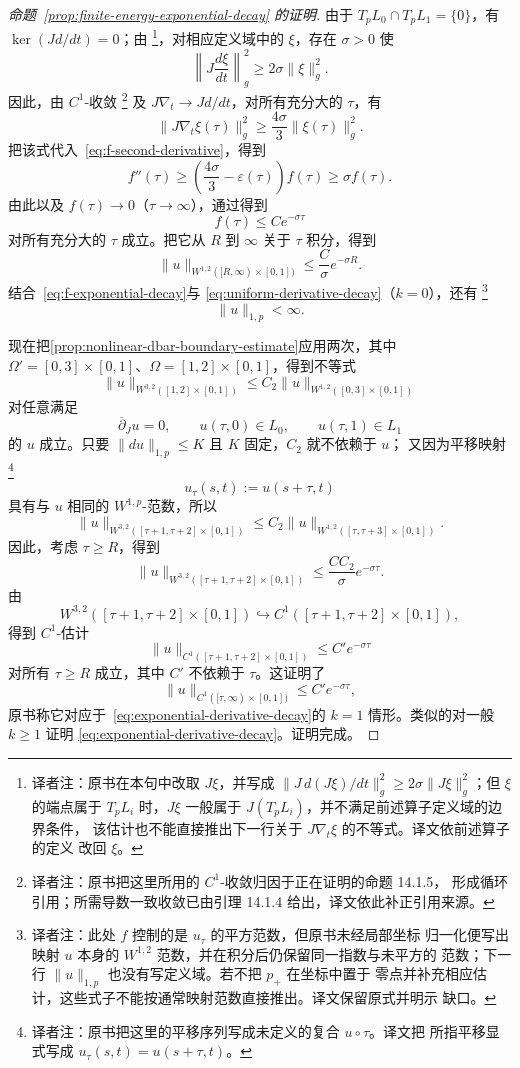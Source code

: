 \begin{proof}[命题~\ref{prop:finite-energy-exponential-decay} 的证明]
由于 $T_pL_0\cap T_pL_1=\{0\}$，有 $\ker(Jd/dt)=0$；由\termOpenMappingTheorem{}
\footnote{译者注：原书在本句中改取 $J\xi$，并写成
$\|J\,d(J\xi)/dt\|_g^2\geq2\sigma\|J\xi\|_g^2$；但 $\xi$ 的端点属于
$T_pL_i$ 时，$J\xi$ 一般属于 $J(T_pL_i)$，并不满足前述算子定义域的边界条件，
该估计也不能直接推出下一行关于 $J\nabla_t\xi$ 的不等式。译文依前述算子的定义
改回 $\xi$。}，对相应定义域中的 $\xi$，存在 $\sigma>0$ 使
\[
  \left\|J\frac{d\xi}{dt}\right\|_g^2
  \geq2\sigma\|\xi\|_g^2.
\]
因此，由 $C^1$-收敛
\footnote{译者注：原书把这里所用的 $C^1$-收敛归因于正在证明的命题 14.1.5，
形成循环引用；所需导数一致收敛已由引理 14.1.4 给出，译文依此补正引用来源。}
及 $J\nabla_t\to Jd/dt$，对所有充分大的 $\tau$，有
\[
  \|J\nabla_t\xi(\tau)\|_g^2
  \geq\frac{4\sigma}{3}\|\xi(\tau)\|_g^2.
\]
把该式代入~\eqref{eq:f-second-derivative}，得到
\[
  f''(\tau)
  \geq\left(\frac{4\sigma}{3}-\varepsilon(\tau)\right)f(\tau)
  \geq\sigma f(\tau).
\]
由此以及 $f(\tau)\to0$（$\tau\to\infty$），通过\termMaximumPrinciple{}得到
\begin{equation}
  f(\tau)\leq Ce^{-\sigma\tau}
\label{eq:f-exponential-decay}
\end{equation}
对所有充分大的 $\tau$ 成立。把它从 $R$ 到 $\infty$ 关于 $\tau$ 积分，得到
\[
  \|u\|_{W^{1,2}([R,\infty)\times[0,1])}
  \leq\frac C\sigma e^{-\sigma R}.
\]
结合~\eqref{eq:f-exponential-decay}与
\eqref{eq:uniform-derivative-decay}（$k=0$），还有
\footnote{译者注：此处 $f$ 控制的是 $u_\tau$ 的平方范数，但原书未经局部坐标
归一化便写出映射 $u$ 本身的 $W^{1,2}$ 范数，并在积分后仍保留同一指数与未平方的
范数；下一行 $\|u\|_{1,p}$ 也没有写定义域。若不把 $p_+$ 在\personDarboux{}坐标中置于
零点并补充相应估计，这些式子不能按通常映射范数直接推出。译文保留原式并明示
缺口。}
\[
  \|u\|_{1,p}<\infty.
\]

现在把\cref{prop:nonlinear-dbar-boundary-estimate}应用两次，其中
$\Omega'=[0,3]\times[0,1]$、$\Omega=[1,2]\times[0,1]$，得到不等式
\[
  \|u\|_{W^{3,2}([1,2]\times[0,1])}
  \leq C_2\|u\|_{W^{1,2}([0,3]\times[0,1])}
\]
对任意满足
\[
  \overline\partial_Ju=0,
  \qquad
  u(\tau,0)\in L_0,
  \qquad
  u(\tau,1)\in L_1
\]
的 $u$ 成立。只要 $\|du\|_{1,p}\leq K$ 且 $K$ 固定，$C_2$ 就不依赖于 $u$；
又因为平移映射
\footnote{译者注：原书把这里的平移序列写成未定义的复合 $u\circ\tau$。译文把
所指平移显式写成 $u_\tau(s,t)=u(s+\tau,t)$。}
\[
  u_\tau(s,t):=u(s+\tau,t)
\]
具有与 $u$ 相同的 $W^{1,p}$-范数，所以
\[
  \|u\|_{W^{3,2}([\tau+1,\tau+2]\times[0,1])}
  \leq
  C_2\|u\|_{W^{1,2}([\tau,\tau+3]\times[0,1])}.
\]
因此，考虑 $\tau\geq R$，得到
\[
  \|u\|_{W^{3,2}([\tau+1,\tau+2]\times[0,1])}
  \leq\frac{CC_2}{\sigma}e^{-\sigma\tau}.
\]
由\termSobolevEmbedding{}
\[
  W^{3,2}([\tau+1,\tau+2]\times[0,1])
  \hookrightarrow
  C^1([\tau+1,\tau+2]\times[0,1]),
\]
得到 $C^1$-估计
\[
  \|u\|_{C^1([\tau+1,\tau+2]\times[0,1])}
  \leq C'e^{-\sigma\tau}
\]
对所有 $\tau\geq R$ 成立，其中 $C'$ 不依赖于 $\tau$。这证明了
\[
  \|u\|_{C^1([\tau,\infty)\times[0,1])}
  \leq C'e^{-\sigma\tau},
\]
原书称它对应于~\eqref{eq:exponential-derivative-decay}的 $k=1$ 情形。类似的\termBootstrapArgument{}对一般 $k\geq1$ 证明
\eqref{eq:exponential-derivative-decay}。证明完成。
\end{proof}

